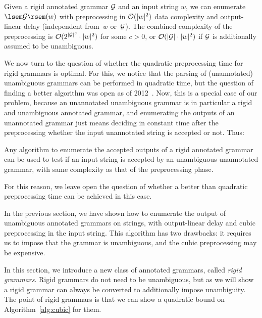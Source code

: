 \begin{theorem}
\label{thm:quadratic}
  Given a rigid annotated grammar $\mathcal{G}$ and an input string $w$, we can enumerate
  $\sem{\cG}(w)$ with preprocessing in $\mathcal{O}(|w|^2)$ data complexity and
  output-linear delay (independent from~$w$ or~$\mathcal{G}$). The combined complexity
  of the preprocessing is $\mathcal{O}(2^{|\mathcal{G}|^c} \cdot |w|^2)$ for some $c >0$, or
  $\mathcal{O}(|\mathcal{G}| \cdot
  |w|^2)$ if $\mathcal{G}$ is additionally assumed to be unambiguous.
\end{theorem}


We now turn to the question of whether the quadratic preprocessing time for
rigid grammars is optimal. For this, we notice that the parsing of
(unannotated) unambiguous grammars can be performed in quadratic time, but the
question of finding a better algorithm was open as of
2012~\cite{schmitz2012can}. Now, this is a special case of our problem, because
an unannotated unambiguous grammar is in particular a rigid and unambiguous
annotated grammar, and enumerating the outputs of an unannotated grammar just
means deciding in constant time after the preprocessing whether the input
unannotated string is accepted or not. Thus:

\begin{proposition}\label{prp:redunann}
  Any algorithm to enumerate the accepted outputs of a rigid
  annotated grammar can be used to test if an input string is accepted by an
  unambiguous unannotated grammar, with same complexity as that of the
  preprocessing phase.
\end{proposition}

For this reason, we leave open the question of whether a better than quadratic
preprocessing time can be achieved in this case.


%
%

In the previous section, we have shown how to enumerate the output of
unambiguous annotated grammars on strings, with output-linear delay and cubic
preprocessing in the input string. This algorithm has two drawbacks: it requires
us to impose that the grammar is unambiguous, and the cubic preprocessing 
%
may be expensive.

In this section, we introduce a new class of annotated grammars, called
\emph{rigid grammars}. Rigid grammars do not need to be
unambiguous, but as we will show a rigid grammar can always be converted to
additionally impose unambiguity. The point of rigid grammars is that we can show
a quadratic bound on Algorithm~\ref{alg:cubic} for them.

